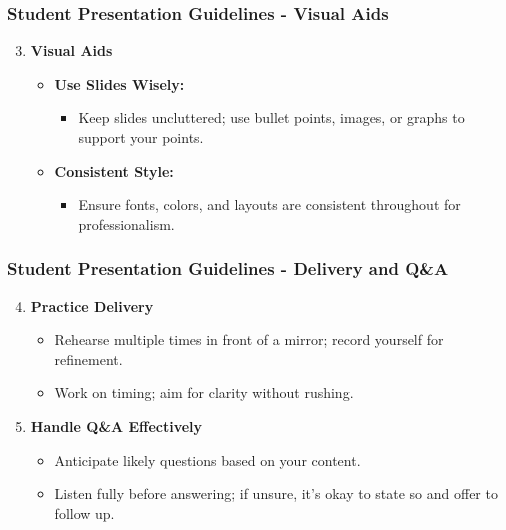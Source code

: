 \documentclass[aspectratio=169]{beamer}
\begin{document}
\begin{frame}[fragile]
    \frametitle{Student Presentation Guidelines - Visual Aids}
    \begin{enumerate}
        \setcounter{enumi}{2}
        \item \textbf{Visual Aids}
            \begin{itemize}
                \item \textbf{Use Slides Wisely:} 
                    \begin{itemize}
                        \item Keep slides uncluttered; use bullet points, images, or graphs to support your points.
                    \end{itemize}
                \item \textbf{Consistent Style:} 
                    \begin{itemize}
                        \item Ensure fonts, colors, and layouts are consistent throughout for professionalism.
                    \end{itemize}
            \end{itemize}
    \end{enumerate}
\end{frame}

\begin{frame}[fragile]
    \frametitle{Student Presentation Guidelines - Delivery and Q\&A}
    \begin{enumerate}
        \setcounter{enumi}{3}
        \item \textbf{Practice Delivery}
            \begin{itemize}
                \item Rehearse multiple times in front of a mirror; record yourself for refinement.
                \item Work on timing; aim for clarity without rushing.
            \end{itemize}
            
        \item \textbf{Handle Q\&A Effectively}
            \begin{itemize}
                \item Anticipate likely questions based on your content.
                \item Listen fully before answering; if unsure, it's okay to state so and offer to follow up.
            \end{itemize}
    \end{enumerate}
\end{frame}
\end{document}
